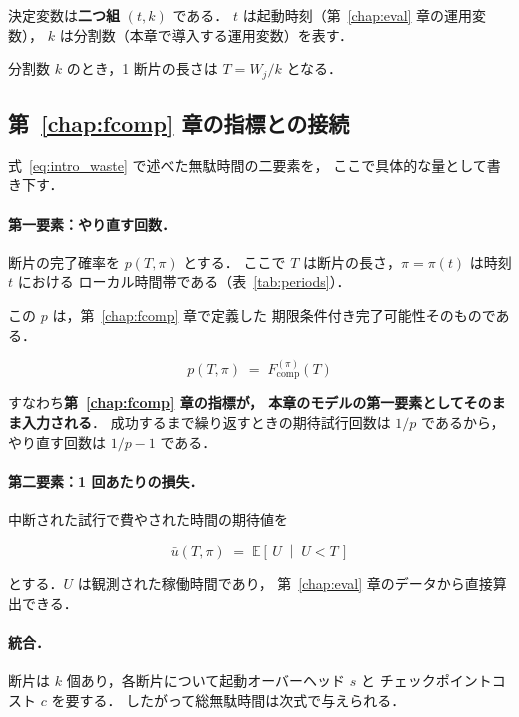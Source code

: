 \documentclass[11pt,a4paper]{ltjsreport}
\newcommand{\Fcomp}{F_{\mathrm{comp}}}
\newcommand{\E}{\mathbb{E}}
\begin{document}
決定変数は\textbf{二つ組} $(t, k)$ である．
$t$ は起動時刻（第~\ref{chap:eval} 章の運用変数），
$k$ は分割数（本章で導入する運用変数）を表す．

分割数 $k$ のとき，1 断片の長さは $T = W_j / k$ となる．

\subsection{第~\ref{chap:fcomp} 章の指標との接続}
\label{sec:connect}

式~\eqref{eq:intro_waste} で述べた無駄時間の二要素を，
ここで具体的な量として書き下す．

\paragraph{第一要素：やり直す回数．}
断片の完了確率を $p(T,\pi)$ とする．
ここで $T$ は断片の長さ，$\pi = \pi(t)$ は時刻 $t$ における
ローカル時間帯である（表~\ref{tab:periods}）．

この $p$ は，第~\ref{chap:fcomp} 章で定義した
期限条件付き完了可能性そのものである．

\begin{equation}
p(T, \pi) \;=\; \Fcomp^{(\pi)}(T)
\label{eq:p_is_fcomp}
\end{equation}

すなわち\textbf{第~\ref{chap:fcomp} 章の指標が，
本章のモデルの第一要素としてそのまま入力される}．
成功するまで繰り返すときの期待試行回数は $1/p$ であるから，
やり直す回数は $1/p - 1$ である．

\paragraph{第二要素：1 回あたりの損失．}
中断された試行で費やされた時間の期待値を

\begin{equation}
\bar u(T, \pi) \;=\; \E\!\left[\,U \;\middle|\; U < T\,\right]
\label{eq:ubar}
\end{equation}

とする．$U$ は観測された稼働時間であり，
第~\ref{chap:eval} 章のデータから直接算出できる．

\paragraph{統合．}
断片は $k$ 個あり，各断片について起動オーバーヘッド $s$ と
チェックポイントコスト $c$ を要する．
したがって総無駄時間は次式で与えられる．
\end{document}
